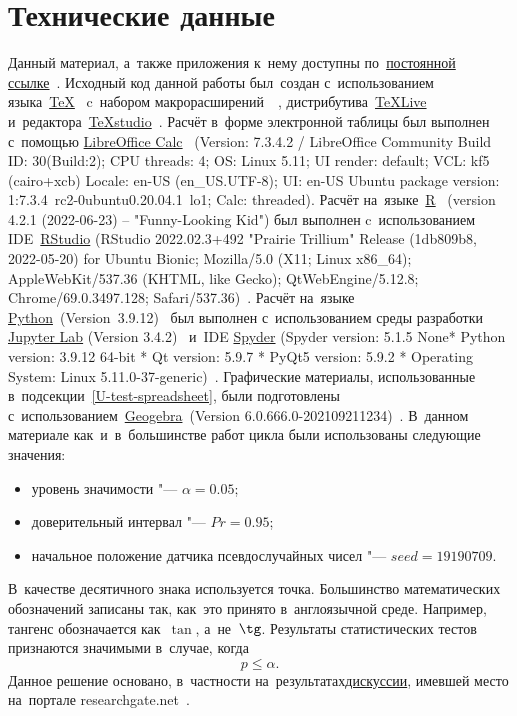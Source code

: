 \documentclass[]{scrreprt}
\begin{document}
\chapter{Технические данные}
Данный материал, а~также приложения к~нему доступны по~\href{https://github.com/Kirill-Murashev/AI_for_valuers_book/tree/main/Parts-Chapters/Mann-Whitney-Wilcoxon}{постоянной ссылке}~\cite{Murashev:u-test}. Исходный код данной работы был~создан с~использованием языка~\href{https://www.ctan.org/}{\TeX}~\cite{TeX:site} c~набором макрорасширений~\href{https://www.latex-project.org/}{\LaTeXe}~\cite{LaTeX:site}, дистрибутива~\href{https://www.tug.org/texlive/}{TeXLive}~\cite{TeXLive:site} и~редактора~\href{https://www.texstudio.org/}{TeXstudio}~\cite{TeXstudio:site}. Расчёт в~форме электронной таблицы был выполнен с~помощью \href{https://www.libreoffice.org/discover/calc/}{LibreOffice Calc}~\cite{LO:Calc} (Version: 7.3.4.2 / LibreOffice Community Build ID: 30(Build:2); CPU threads: 4; OS: Linux 5.11; UI render: default; VCL: kf5 (cairo+xcb) Locale: en-US (en\_US.UTF-8); UI: en-US Ubuntu package version: 1:7.3.4~rc2-0ubuntu0.20.04.1~lo1; Calc: threaded). Расчёт на~языке~\href{https://www.r-project.org/}{R}~\cite{R_language} (version 4.2.1 (2022-06-23) -- "Funny-Looking Kid") был выполнен c~использованием IDE~\href{https://www.rstudio.com/}{RStudio} (RStudio 2022.02.3+492 "Prairie Trillium" Release (1db809b8, 2022-05-20) for Ubuntu Bionic; Mozilla/5.0 (X11; Linux x86\_64); AppleWebKit/537.36 (KHTML, like Gecko); QtWebEngine/5.12.8; Chrome/69.0.3497.128; Safari/537.36)~\cite{RStudio:official_site}. Расчёт на~языке \href{https://www.python.org/}{Python}~(Version~3.9.12)~\cite{Python:site} был выполнен с~использованием среды разработки \href{https://jupyter.org}{Jupyter Lab} (Version 3.4.2)~\cite{Jupyter:site} и~IDE \href{https://www.spyder-ide.org/}{Spyder} (Spyder version: 5.1.5 None* Python version: 3.9.12 64-bit * Qt version: 5.9.7 * PyQt5 version: 5.9.2
* Operating System: Linux 5.11.0-37-generic)~\cite{Spyder:site}. Графические материалы, использованные в~подсекции~\ref{U-test-spreadsheet}, были подготовлены с~использованием~\href{Geogebra:official-site}{Geogebra}~(Version 6.0.666.0-202109211234)~\cite{Geogebra:official-site}.
В~данном материале как~и~в~большинстве работ цикла были использованы следующие значения:
\begin{itemize}
	\item уровень значимости "--- $\alpha = 0.05$;
	\item доверительный интервал "--- $Pr = 0.95$;
	\item начальное положение датчика псевдослучайных чисел "--- $seed = 19190709$.
\end{itemize}
В~качестве десятичного знака используется точка. Большинство математических обозначений записаны так, как~это принято в~англоязычной среде. Например, тангенс обозначается как~$\tan$, а~не~$\tg$. Результаты статистических тестов признаются значимыми в~случае, когда
\begin{equation}\label{eq:ignificance }
 p \leq \alpha.
\end{equation}
Данное решение основано, в~частности на~результатах\href{researchgate.net}{дискуссии}, имевшей место на~портале researchgate.net~\cite{RG:p-equals-alpha}.
%
\end{document}

